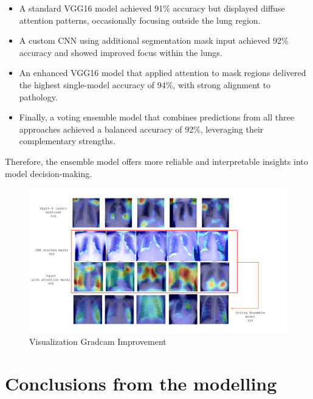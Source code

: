 \documentclass{article}
\begin{document}
\begin{itemize}
    \item A standard VGG16 model achieved 91\% accuracy but displayed diffuse attention patterns, occasionally focusing outside the lung region.
    \item A custom CNN using additional segmentation mask input achieved 92\% accuracy and showed improved focus within the lungs.
    \item An enhanced VGG16 model that applied attention to mask regions delivered the highest single-model accuracy of 94\%, with strong alignment to pathology.
     \item Finally, a voting ensemble model that combines predictions from all three approaches achieved a balanced accuracy of 92\%, leveraging their complementary strengths.
\end{itemize}

Therefore, the ensemble model offers more reliable and interpretable insights into model decision-making.

\begin{figure}%
    \centering
    \includegraphics[width=1.0\linewidth]{gradcam_final.png}
    \caption{Visualization Gradcam Improvement}
    \label{fig:Visualization of Gradcam}
\end{figure}



\newpage

\section{Conclusions from the modelling}
\end{document}
